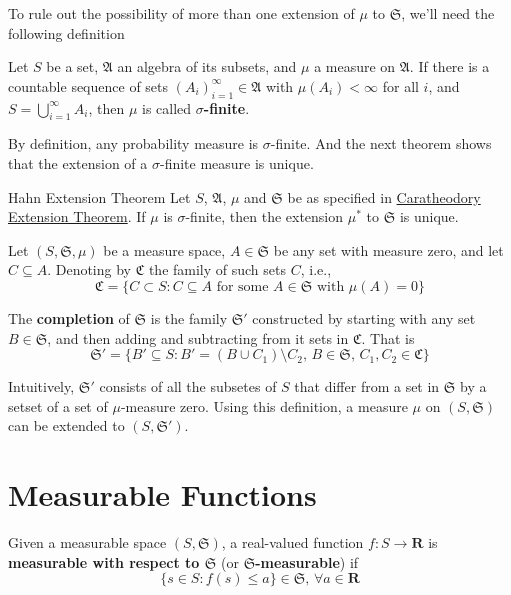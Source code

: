 To rule out the possibility of more than one extension of $\mu$ to $\mathfrak{S}$, we'll need the following definition

\begin{definition}[]{}{}
	Let $S$ be a set, $\mathfrak{A}$ an algebra of its subsets, and $\mu$ a measure on $\mathfrak{A}$. If there is a countable sequence of sets $(A_i)_{i=1}^\infty \in \mathfrak{A}$ with $\mu(A_i) < \infty$ for all $i$, and $S = \bigcup_{i=1}^\infty A_i$, then $\mu$ is called \textbf{$\sigma$-finite}.
\end{definition}

By definition, any probability measure is $\sigma$-finite. And the next theorem shows that the extension of a $\sigma$-finite measure is unique.

\begin{theorem}[]{Hahn Extension Theorem}{}
	Let $S$, $\mathfrak{A}$, $\mu$ and $\mathfrak{S}$ be as specified in \hyperref[thm:caratheodory]{Caratheodory Extension Theorem}. If $\mu$ is $\sigma$-finite, then the extension $\mu^{\ast}$ to $\mathfrak{S}$ is unique.
\end{theorem}

\begin{definition}[]{}{}
	Let $(S, \mathfrak{S}, \mu)$ be a measure space, $A \in \mathfrak{S}$ be any set with measure zero, and let $C \subseteq A$. Denoting by $\mathfrak{C}$ the family of such sets $C$, i.e.,
	\[
		\mathfrak{C} = \{ C \subset S : C \subseteq A \text{ for some } A \in \mathfrak{S} \text{ with } \mu(A) = 0 \}
	\]

	The \textbf{completion} of $\mathfrak{S}$ is the family $\mathfrak{S}'$ constructed by starting with any set $B \in \mathfrak{S}$, and then adding and subtracting from it sets in $\mathfrak{C}$. That is 
	\[
		\mathfrak{S}' = \{ B' \subseteq S : B' = (B \cup C_1) \setminus C_2, \, B \in \mathfrak{S}, \, C_1, C_2 \in \mathfrak{C} \} 
	\]
\end{definition}

Intuitively, $\mathfrak{S}'$ consists of all the subsetes of $S$ that differ from a set in $\mathfrak{S}$ by a setset of a set of $\mu$-measure zero. Using this definition, a measure $\mu$ on $(S, \mathfrak{S})$ can be extended to $(S, \mathfrak{S}')$.

\section{Measurable Functions}

\begin{definition}[]{}{}
	Given a measurable space $(S, \mathfrak{S})$, a real-valued function $f : S \longrightarrow \textbf{R}$ is \textbf{measurable with respect to $\mathfrak{S}$} (or \textbf{$\mathfrak{S}$-measurable}) if 
	\[
		\{ s \in S : f(s) \leq a \} \in \mathfrak{S}, \, \forall a \in \textbf{R}
	\]
\end{definition}

